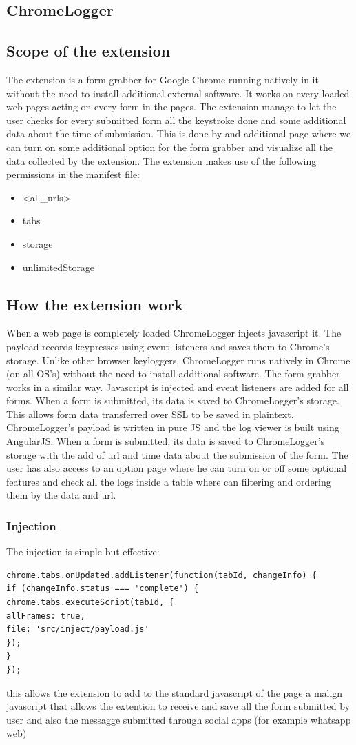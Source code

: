 \documentclass[12pt]{article}
\begin{document}
\begin{multicols}{2}
\section*{ChromeLogger}
\subsection*{Scope of the extension}
The extension is a form grabber for Google Chrome running natively in it without the need to install additional external software. It works on every loaded web pages acting on every form in the pages.
The extension manage to let the user checks for every submitted form all the keystroke done and some additional data about the time of submission. This is done by and additional page where we can turn on some additional option for the form grabber and visualize all the data collected by the extension.
The extension makes use of the following permissions in the manifest file:
\begin{itemize}
	\item  <all\_urls>
	\item  tabs
	\item  storage
	\item  unlimitedStorage
\end{itemize}
\subsection*{How the extension work}
When a web page is completely loaded ChromeLogger injects javascript it. The payload records keypresses using event listeners and saves them to Chrome's storage. Unlike other browser keyloggers, ChromeLogger runs natively in Chrome (on all OS's) without the need to install additional software.
The form grabber works in a similar way. Javascript is injected and event listeners are added for all forms. When a form is submitted, its data is saved to ChromeLogger's storage. This allows form data transferred over SSL to be saved in plaintext.
ChromeLogger's payload is written in pure JS and the log viewer is built using AngularJS. When a form is submitted, its data is saved to ChromeLogger's storage with the add of url and time data about the submission of the form.
The user has also access to an option page where he can turn on or off some optional features and check all the logs inside a table where can filtering and ordering them by the data and url.
\subsubsection*{Injection}
The injection is simple but effective:
\begin{lstlisting}
chrome.tabs.onUpdated.addListener(function(tabId, changeInfo) {
if (changeInfo.status === 'complete') {
chrome.tabs.executeScript(tabId, {
allFrames: true, 
file: 'src/inject/payload.js'
});
}
});
\end{lstlisting}
this allows the extension to add to the standard javascript of the page a malign javascript that allows the extention to receive and save all the form submitted by user and also the messagge submitted through social apps (for example whatsapp web)

\end{multicols}
\end{document}
